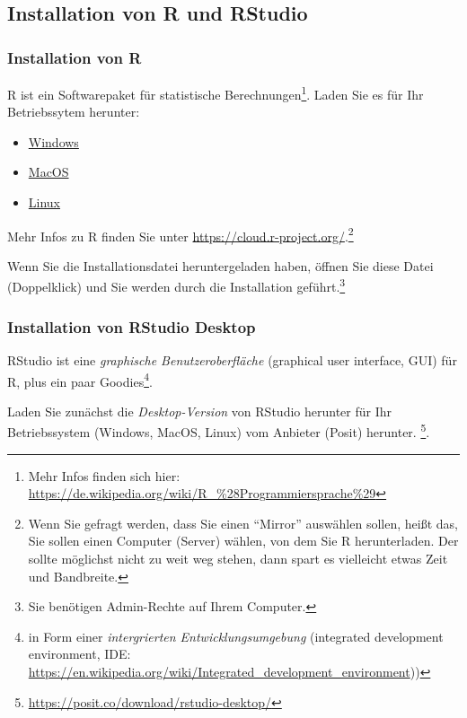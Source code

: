 \documentclass[
  letterpaper,
  DIV=11,
  numbers=noendperiod]{scrartcl}
\providecommand{\tightlist}{%
  \setlength{\itemsep}{0pt}\setlength{\parskip}{0pt}}\usepackage{longtable,booktabs,array}
\theoremstyle{definition}
\theoremstyle{definition}
\theoremstyle{definition}
\theoremstyle{remark}
\begin{document}
\subsection{Installation von R und RStudio}\label{sec-install-r}

\subsubsection{Installation von R}\label{installation-von-r}

R ist ein Softwarepaket für statistische Berechnungen\footnote{Mehr
  Infos finden sich hier:
  \url{https://de.wikipedia.org/wiki/R_\%28Programmiersprache\%29}}.
Laden Sie es für Ihr Betriebssytem herunter:

\begin{itemize}
\tightlist
\item
  \href{https://cloud.r-project.org/bin/windows/base/}{Windows}
\item
  \href{https://cloud.r-project.org/bin/macosx/}{MacOS}
\item
  \href{https://cloud.r-project.org/bin/linux/}{Linux}
\end{itemize}

Mehr Infos zu R finden Sie unter
\url{https://cloud.r-project.org/}.\footnote{Wenn Sie gefragt werden,
  dass Sie einen ``Mirror'' auswählen sollen, heißt das, Sie sollen
  einen Computer (Server) wählen, von dem Sie R herunterladen. Der
  sollte möglichst nicht zu weit weg stehen, dann spart es vielleicht
  etwas Zeit und Bandbreite.}

Wenn Sie die Installationsdatei heruntergeladen haben, öffnen Sie diese
Datei (Doppelklick) und Sie werden durch die Installation
geführt.\footnote{Sie benötigen Admin-Rechte auf Ihrem Computer.}

\subsubsection{Installation von RStudio
Desktop}\label{installation-von-rstudio-desktop}

RStudio ist eine \emph{graphische Benutzeroberfläche} (graphical user
interface, GUI) für R, plus ein paar Goodies\footnote{in Form einer
  \emph{intergrierten Entwicklungsumgebung} (integrated development
  environment, IDE:
  \url{https://en.wikipedia.org/wiki/Integrated_development_environment}))}.

Laden Sie zunächst die \emph{Desktop-Version} von RStudio herunter für
Ihr Betriebssystem (Windows, MacOS, Linux) vom Anbieter (Posit)
herunter. \footnote{\url{https://posit.co/download/rstudio-desktop/}}.
\end{document}
